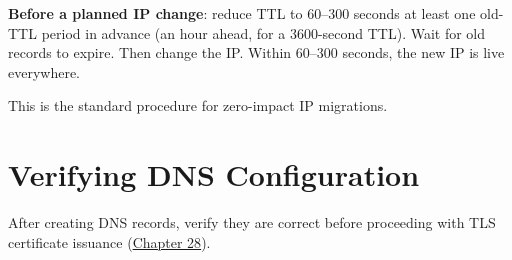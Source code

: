 \textbf{Before a planned IP change}: reduce TTL to 60--300 seconds at least one old-TTL period in advance (an hour ahead, for a 3600-second TTL). Wait for old records to expire. Then change the IP. Within 60--300 seconds, the new IP is live everywhere.

\begin{codebox}[short]

\begin{Shaded}
\begin{Highlighting}[]
\end{Highlighting}
\end{Shaded}

\end{codebox}

\noindent{}This is the standard procedure for zero-impact IP migrations.

\setcounter{section}{5}
\section{Verifying DNS Configuration}\label{27-domain-and-dns:276-verifying-dns-configuration}

After creating DNS records, verify they are correct before proceeding with TLS certificate issuance (\hyperref[ch:28-traffic-routing]{Chapter 28}).

